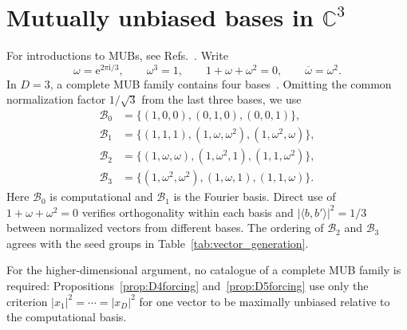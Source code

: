 \documentclass[%
  reprint,
  superscriptaddress,
  showpacs,
  showkeys,
  amsmath,amssymb,
  pra,
  longbibliography,
  floatfix,
  x11names
]{revtex4-2}
\newcommand{\ii}{\mathrm{i}}
\newenvironment{revision}{\begingroup\color{revisionblue}}{\endgroup}
\begin{document}



\appendix

\begin{revision}
\section{Mutually unbiased bases in $\mathbb{C}^3$}
\label{appendix:MUBsD3}

For introductions to MUBs, see Refs.~\cite{Schwinger.60,WooFie,Brierley2009,springerlink:10.1007/978-3-540-24633-6_10,durt,mcnulty2024mutually}.  Write
\[
\omega=\mathrm{e}^{2\pi\ii{}/3},\qquad
\omega^3=1,\qquad 1+\omega+\omega^2=0,
\qquad \overline{\omega}=\omega^2.
\]
In $D=3$, a complete MUB family contains four bases~\cite{ivanovic-1997}.  Omitting the common normalization factor $1/\sqrt{3}$ from the last three bases, we use
\begin{align}
\mathcal{B}_0&=\{(1,0,0),(0,1,0),(0,0,1)\}, \label{eq:B0_3}\\
\mathcal{B}_1&=\{(1,1,1),(1,\omega,\omega^2),(1,\omega^2,\omega)\}, \label{eq:B1_3}\\
\mathcal{B}_2&=\{(1,\omega,\omega),(1,\omega^2,1),(1,1,\omega^2)\}, \label{eq:B2_3}\\
\mathcal{B}_3&=\{(1,\omega^2,\omega^2),(1,\omega,1),(1,1,\omega)\}. \label{eq:B3_3}
\end{align}
Here $\mathcal{B}_0$ is computational and $\mathcal{B}_1$ is the Fourier basis.  Direct use of $1+\omega+\omega^2=0$ verifies orthogonality within each basis and $|\langle b,b'\rangle|^2=1/3$ between normalized vectors from different bases.  The ordering of $\mathcal{B}_2$ and $\mathcal{B}_3$ agrees with the seed groups in Table~\ref{tab:vector_generation}.

For the higher-dimensional argument, no catalogue of a complete MUB family is required: Propositions~\ref{prop:D4forcing} and~\ref{prop:D5forcing} use only the criterion $|x_1|^2=\cdots=|x_D|^2$ for one vector to be maximally unbiased relative to the computational basis.
\end{revision}
\end{document}
